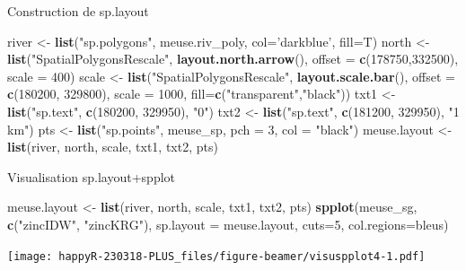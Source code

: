 \documentclass[8pt,ignorenonframetext,]{beamer}
\newenvironment{Shaded}{\begin{snugshade}}{\end{snugshade}}
\newcommand{\KeywordTok}[1]{\textcolor[rgb]{0.13,0.29,0.53}{\textbf{{#1}}}}
\newcommand{\DataTypeTok}[1]{\textcolor[rgb]{0.13,0.29,0.53}{{#1}}}
\newcommand{\DecValTok}[1]{\textcolor[rgb]{0.00,0.00,0.81}{{#1}}}
\newcommand{\StringTok}[1]{\textcolor[rgb]{0.31,0.60,0.02}{{#1}}}
\newcommand{\NormalTok}[1]{{#1}}
\begin{document}
\begin{frame}[fragile]{Construction de sp.layout}

\begin{Shaded}
\begin{Highlighting}[]
\NormalTok{river <-}\StringTok{ }\KeywordTok{list}\NormalTok{(}\StringTok{"sp.polygons"}\NormalTok{, meuse.riv_poly, }\DataTypeTok{col=}\StringTok{'darkblue'}\NormalTok{, }\DataTypeTok{fill=}\NormalTok{T)}
\NormalTok{north <-}\StringTok{ }\KeywordTok{list}\NormalTok{(}\StringTok{"SpatialPolygonsRescale"}\NormalTok{, }\KeywordTok{layout.north.arrow}\NormalTok{(), }\DataTypeTok{offset =} 
                \KeywordTok{c}\NormalTok{(}\DecValTok{178750}\NormalTok{,}\DecValTok{332500}\NormalTok{),}
              \DataTypeTok{scale =} \DecValTok{400}\NormalTok{)}
\NormalTok{scale <-}\StringTok{ }\KeywordTok{list}\NormalTok{(}\StringTok{"SpatialPolygonsRescale"}\NormalTok{, }\KeywordTok{layout.scale.bar}\NormalTok{(), }\DataTypeTok{offset =} 
                \KeywordTok{c}\NormalTok{(}\DecValTok{180200}\NormalTok{, }\DecValTok{329800}\NormalTok{), }\DataTypeTok{scale =} \DecValTok{1000}\NormalTok{, }\DataTypeTok{fill=}\KeywordTok{c}\NormalTok{(}\StringTok{"transparent"}\NormalTok{,}\StringTok{"black"}\NormalTok{))}
\NormalTok{txt1 <-}\StringTok{ }\KeywordTok{list}\NormalTok{(}\StringTok{"sp.text"}\NormalTok{, }\KeywordTok{c}\NormalTok{(}\DecValTok{180200}\NormalTok{, }\DecValTok{329950}\NormalTok{), }\StringTok{"0"}\NormalTok{)}
\NormalTok{txt2 <-}\StringTok{ }\KeywordTok{list}\NormalTok{(}\StringTok{"sp.text"}\NormalTok{, }\KeywordTok{c}\NormalTok{(}\DecValTok{181200}\NormalTok{, }\DecValTok{329950}\NormalTok{), }\StringTok{"1 km"}\NormalTok{)}
\NormalTok{pts <-}\StringTok{ }\KeywordTok{list}\NormalTok{(}\StringTok{"sp.points"}\NormalTok{, meuse_sp, }\DataTypeTok{pch =} \DecValTok{3}\NormalTok{, }\DataTypeTok{col =} \StringTok{"black"}\NormalTok{)}
\NormalTok{meuse.layout <-}\StringTok{ }\KeywordTok{list}\NormalTok{(river, north, scale, txt1, txt2, pts)}
\end{Highlighting}
\end{Shaded}

\end{frame}

\begin{frame}[fragile]{Visualisation sp.layout+spplot}

\begin{Shaded}
\begin{Highlighting}[]
\NormalTok{meuse.layout <-}\StringTok{ }\KeywordTok{list}\NormalTok{(river, north, scale, txt1, txt2, pts)}
\KeywordTok{spplot}\NormalTok{(meuse_sg, }\KeywordTok{c}\NormalTok{(}\StringTok{"zincIDW"}\NormalTok{, }\StringTok{"zincKRG"}\NormalTok{), }\DataTypeTok{sp.layout =} \NormalTok{meuse.layout, }\DataTypeTok{cuts=}\DecValTok{5}\NormalTok{, }\DataTypeTok{col.regions=}\NormalTok{bleus)}
\end{Highlighting}
\end{Shaded}

\texttt{[image: happyR-230318-PLUS\_files/figure-beamer/visuspplot4-1.pdf]}

\end{frame}
\end{document}
